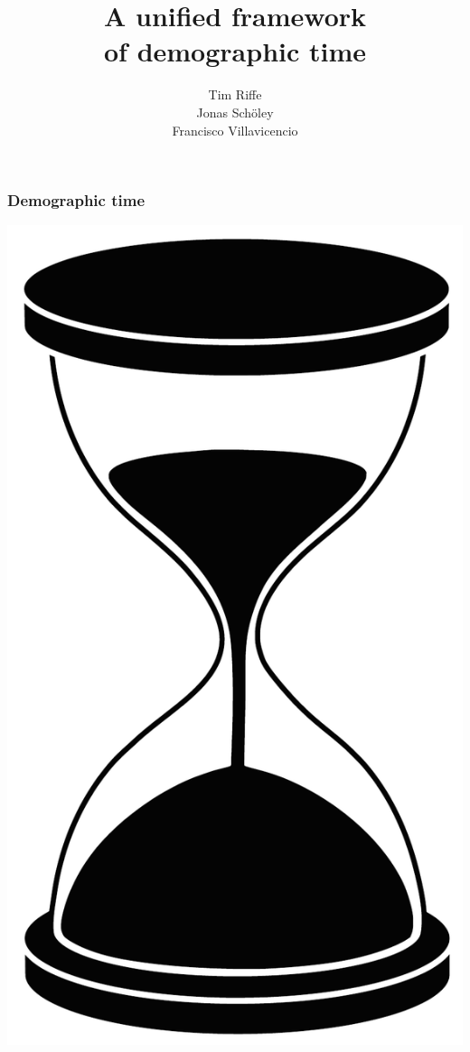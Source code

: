 \documentclass[20pt]{beamer}
\title{A unified framework\\ of demographic time}
\subtitle{Tim Riffe \\ Jonas Sch{\"o}ley \\ Francisco Villavicencio}		%
\begin{document}

\begin{frame}
	\titlepage
\end{frame}
\begin{frame}
\frametitle{Demographic time}
\begin{center}
\includegraphics[scale=.5]{Figures/hourglass.pdf}
\end{center}
\end{frame}
\end{document}
